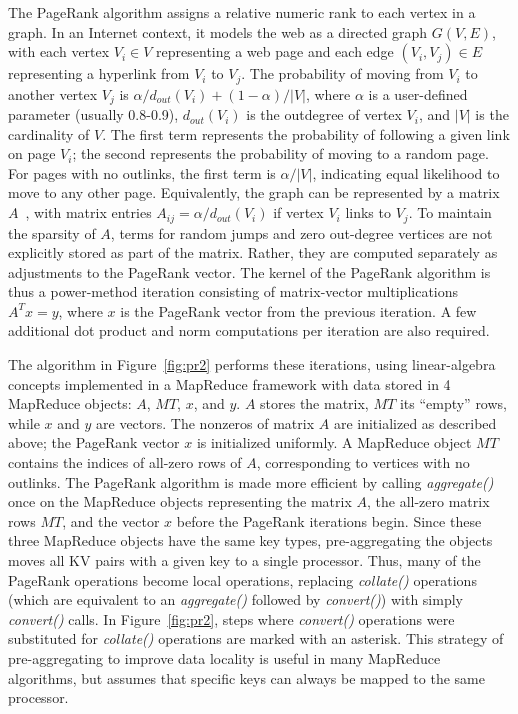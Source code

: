 The PageRank algorithm assigns a relative numeric rank to each vertex
in a graph.  In an Internet context, it models the web as a directed
graph $G(V,E)$, with each vertex $V_i \in V$ representing a web page
and each edge $(V_i, V_j) \in E$ representing a hyperlink from $V_i$
to $V_j$.  The probability of moving from $V_i$ to another vertex
$V_j$ is $\alpha/d_{out}(V_i) + (1-\alpha)/|V|$, where $\alpha$ is a
user-defined parameter (usually 0.8-0.9), $d_{out}(V_i)$ is the
outdegree of vertex $V_i$, and $|V|$ is the cardinality of $V$.  The
first term represents the probability of following a given link on
page $V_i$; the second represents the probability of moving to a
random page.  For pages with no outlinks, the first term is
$\alpha/|V|$, indicating equal likelihood to move to any other page.
Equivalently, the graph can be represented by a matrix
$A$~\cite{LangvilleMeyer05a}, with matrix entries $A_{ij} =
\alpha/d_{out}(V_i)$ if vertex $V_i$ links to $V_j$.  To maintain the
sparsity of $A$, terms for random jumps and zero out-degree vertices
are not explicitly stored as part of the matrix.  Rather, they are
computed separately as adjustments to the PageRank vector.  The kernel
of the PageRank algorithm is thus a power-method iteration consisting
of matrix-vector multiplications $A^T x=y$, where $x$ is the PageRank
vector from the previous iteration.  A few additional dot product and
norm computations per iteration are also required.

The algorithm in Figure~\ref{fig:pr2} performs these iterations, using
linear-algebra concepts implemented in a MapReduce framework with data
stored in 4 MapReduce objects: $A$, $MT$, $x$, and $y$.  $A$ stores
the matrix, $MT$ its ``empty'' rows, while $x$ and $y$ are vectors.
The nonzeros of matrix $A$ are initialized as described above; the
PageRank vector $x$ is initialized uniformly.  A MapReduce object $MT$
contains the indices of all-zero rows of $A$, corresponding to
vertices with no outlinks.  The PageRank algorithm is made more
efficient by calling {\it aggregate()} once on the MapReduce objects
representing the matrix $A$, the all-zero matrix rows $MT$, and the
vector $x$ before the PageRank iterations begin.  Since these three
MapReduce objects have the same key types, pre-aggregating the objects
moves all KV pairs with a given key to a single processor.  Thus, many
of the PageRank operations become local operations, replacing {\it
collate()} operations (which are equivalent to an {\it aggregate()}
followed by {\it convert()}) with simply {\it convert()} calls.  In
Figure~\ref{fig:pr2}, steps where {\it convert()} operations were
substituted for {\it collate()} operations are marked with an
asterisk.  This strategy of pre-aggregating to improve data locality
is useful in many MapReduce algorithms, but assumes that specific keys
can always be mapped to the same processor.

